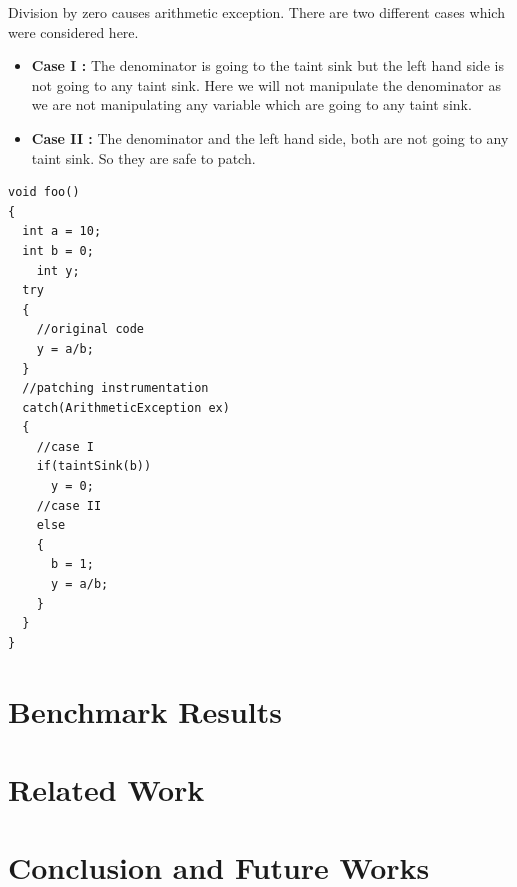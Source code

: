 \documentclass{sigplanconf}
\begin{document}
Division by zero causes arithmetic exception. There are two different cases which were considered here. 
\begin{itemize}
	\item \textbf{Case I :} The denominator is going to the taint sink but the left hand side is not going to any taint sink. Here we will not manipulate the denominator as we are not manipulating any variable which are going to any taint sink.
	\item \textbf{Case II :} The denominator and the left hand side, both are not going to any taint sink. So they are safe to patch.
\end{itemize}

\lstset{language=Java, caption=arithmetic exception : division-by-zero patching, label=patchingexample2}

\begin{lstlisting}
void foo()
{
  int a = 10;
  int b = 0;
	int y;
  try
  {
    //original code
    y = a/b;
  }
  //patching instrumentation
  catch(ArithmeticException ex)
  {
    //case I
    if(taintSink(b))
      y = 0;
    //case II
    else
    {
      b = 1;
      y = a/b;
    }
  }
}
\end{lstlisting}


\section{Benchmark Results}
\label{sec:bench}

\section{Related Work}
\label{sec:rel}

\section{Conclusion and Future Works}
\label{sec:conc}


\acks












\end{document}
